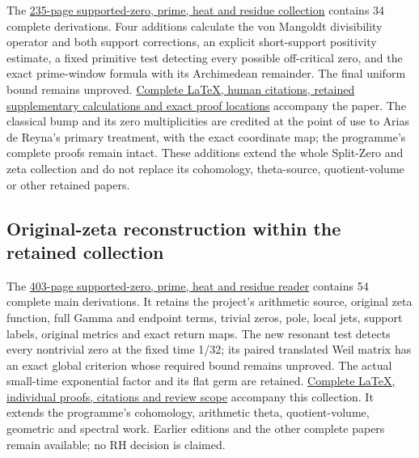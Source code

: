 \documentclass[
]{article}
\begin{document}
The
\href{https://github.com/KokunoYumeto/zeta-function-research-reader/blob/main/workbenches/splitzero-tandem/branches/tau-zero-prime-positivity/TAU_ZERO_PRIME_POSITIVITY.pdf}{235-page
supported-zero, prime, heat and residue collection} contains 34 complete
derivations. Four additions calculate the von Mangoldt divisibility
operator and both support corrections, an explicit short-support
positivity estimate, a fixed primitive test detecting every possible
off-critical zero, and the exact prime-window formula with its
Archimedean remainder. The final uniform bound remains unproved.
\href{https://github.com/KokunoYumeto/zeta-function-research-reader/blob/main/workbenches/splitzero-tandem/branches/tau-zero-prime-positivity/PUBLICATION_COMPANION.md}{Complete
LaTeX, human citations, retained supplementary calculations and exact
proof locations} accompany the paper. The classical bump and its zero
multiplicities are credited at the point of use to Arias de Reyna's
primary treatment, with the exact coordinate map; the programme's
complete proofs remain intact. These additions extend the whole
Split-Zero and zeta collection and do not replace its cohomology,
theta-source, quotient-volume or other retained papers.

\subsection{Original-zeta reconstruction within the retained
collection}\label{original-zeta-reconstruction-within-the-retained-collection}

The
\href{https://github.com/KokunoYumeto/zeta-function-research-reader/blob/main/workbenches/splitzero-tandem/branches/tau-zero-prime-positivity/TAU_ZERO_PRIME_POSITIVITY.pdf}{403-page
supported-zero, prime, heat and residue reader} contains 54 complete
main derivations. It retains the project's arithmetic source, original
zeta function, full Gamma and endpoint terms, trivial zeros, pole, local
jets, support labels, original metrics and exact return maps. The new
resonant test detects every nontrivial zero at the fixed time 1/32; its
paired translated Weil matrix has an exact global criterion whose
required bound remains unproved. The actual small-time exponential
factor and its flat germ are retained.
\href{https://github.com/KokunoYumeto/zeta-function-research-reader/blob/main/workbenches/splitzero-tandem/branches/tau-zero-prime-positivity/PUBLICATION_COMPANION.md}{Complete
LaTeX, individual proofs, citations and review scope} accompany this
collection. It extends the programme's cohomology, arithmetic theta,
quotient-volume, geometric and spectral work. Earlier editions and the
other complete papers remain available; no RH decision is claimed.
\end{document}
